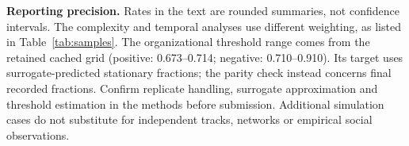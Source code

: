 \documentclass[11pt]{article}
\begin{document}
\textbf{Reporting precision.} Rates in the text are rounded summaries, not
confidence intervals. The complexity and temporal analyses use different
weighting, as listed in Table~\ref{tab:samples}. The organizational threshold
range comes from the retained cached grid (positive: 0.673--0.714;
negative: 0.710--0.910). Its target uses surrogate-predicted stationary fractions;
the parity check instead concerns final recorded fractions. Confirm replicate
handling, surrogate approximation and threshold estimation in the methods
before submission. Additional simulation
cases do not substitute for independent tracks, networks or empirical social
observations.
\fi
\end{document}
